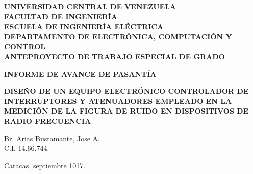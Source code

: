 \documentclass[paper=letter,oneside,fontsize=11pt, parskip=full]{scrartcl}
\begin{document}
		
		
			
		\begin{titlepage}
		
		\begin{center}		
			
			\begin{large}							
				\bfseries
				\uppercase{Universidad Central de Venezuela} \\			
				\uppercase{Facultad de Ingeniería} \\							
				\uppercase{Escuela de Ingeniería Eléctrica} \\
        		\uppercase{Departamento de Electrónica, Computación y Control} \\
        		\uppercase{Anteproyecto de Trabajo Especial de Grado}          	
			\end{large}			
		
			\vfill
			
			\begin{large}
				\bfseries
				\uppercase{Informe de Avance de Pasantía}
			\end{large}
		
			\vspace{2mm}
			
			\begin{Large}
				\begin{spacing}{1.2}
					\bfseries				
		      		\uppercase{Diseño de un equipo electrónico controlador de interruptores y atenuadores empleado en la medición de la figura de ruido en dispositivos de radio frecuencia}	
		      	\end{spacing}
			\end{Large}					
			
			\vfill
			
			\begin{flushright}
				Br. Arias Bustamante, Jose A. \\
				C.I. 14.66.744.
			\end{flushright}
		
			\vfill
			
			\begin{center}
				Caracas, septiembre 1017.
			\end{center}
		
		\end{center}
	
	\end{titlepage}
	
\end{document}
